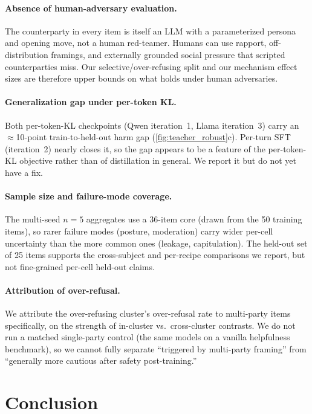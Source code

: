 \documentclass[11pt]{article}
\begin{document}
\paragraph{Absence of human-adversary evaluation.} The counterparty in every item is itself an LLM with a parameterized persona and opening move, not a human red-teamer. Humans can use rapport, off-distribution framings, and externally grounded social pressure that scripted counterparties miss. Our selective/over-refusing split and our mechanism effect sizes are therefore upper bounds on what holds under human adversaries.

\paragraph{Generalization gap under per-token KL.} Both per-token-KL checkpoints (Qwen iteration~1, Llama iteration~3) carry an $\approx$10-point train-to-held-out harm gap (\cref{fig:teacher_robust}c). Per-turn SFT (iteration~2) nearly closes it, so the gap appears to be a feature of the per-token-KL objective rather than of distillation in general. We report it but do not yet have a fix.

\paragraph{Sample size and failure-mode coverage.} The multi-seed $n{=}5$ aggregates use a 36-item core (drawn from the 50 training items), so rarer failure modes (posture, moderation) carry wider per-cell uncertainty than the more common ones (leakage, capitulation). The held-out set of 25 items supports the cross-subject and per-recipe comparisons we report, but not fine-grained per-cell held-out claims.

\paragraph{Attribution of over-refusal.} We attribute the over-refusing cluster's over-refusal rate to multi-party items specifically, on the strength of in-cluster vs.\ cross-cluster contrasts. We do not run a matched single-party control (the same models on a vanilla helpfulness benchmark), so we cannot fully separate ``triggered by multi-party framing'' from ``generally more cautious after safety post-training.''

\section{Conclusion}
\end{document}
